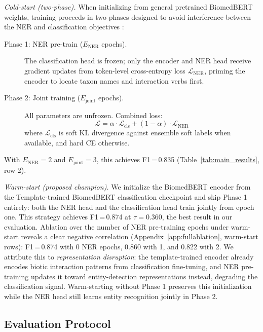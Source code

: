 \documentclass[11pt]{article}
\begin{document}
\emph{Cold-start (two-phase).}
When initializing from general pretrained BiomedBERT weights, training
proceeds in two phases designed to avoid interference between the NER and
classification objectives \citep{liu2019multi}:
\begin{description}
    \item[Phase 1: NER pre-train ($E_\text{NER}$ epochs).]
    The classification head is frozen; only the encoder and NER head receive
    gradient updates from token-level cross-entropy loss $\mathcal{L}_\text{NER}$,
    priming the encoder to locate taxon names and interaction verbs first.

    \item[Phase 2: Joint training ($E_\text{joint}$ epochs).]
    All parameters are unfrozen. Combined loss:
    \[
        \mathcal{L} = \alpha \cdot \mathcal{L}_\text{cls} +
                      (1{-}\alpha) \cdot \mathcal{L}_\text{NER}
    \]
    where $\mathcal{L}_\text{cls}$ is soft KL divergence against ensemble
    soft labels when available, and hard CE otherwise.
\end{description}
With $E_\text{NER}{=}2$ and $E_\text{joint}{=}3$, this achieves
F1\,=\,0.835 (Table~\ref{tab:main_results}, row 2).

\emph{Warm-start (proposed champion).}
We initialize the BiomedBERT encoder from the Template-trained
BiomedBERT classification checkpoint and skip Phase 1 entirely: both the NER head and
the classification head train jointly from epoch one.
This strategy achieves F1\,=\,0.874 at $\tau{=}0.360$, the best result in our evaluation.
Ablation over the number of NER pre-training epochs under warm-start
reveals a clear negative correlation (Appendix~\ref{app:fullablation},
warm-start rows): F1\,=\,0.874 with 0 NER epochs, 0.860 with 1, and
0.822 with 2.
We attribute this to \emph{representation disruption}: the template-trained
encoder already encodes biotic interaction patterns from classification
fine-tuning, and NER pre-training updates it toward entity-detection
representations instead, degrading the classification signal.
Warm-starting without Phase 1 preserves this initialization while the
NER head still learns entity recognition jointly in Phase 2.

\subsection{Evaluation Protocol}
\label{sec:eval}
\end{document}
